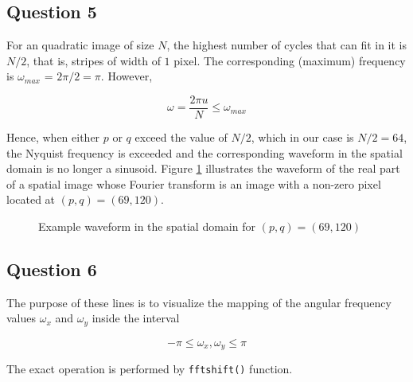 		
		
	\subsection{Question 5}
	
		For an quadratic image of size $N$, the highest number of cycles that can fit in it is $N/2$, that is, stripes of width of $1$ pixel.
		The corresponding (maximum) frequency is $\omega_{max}$ = $2\pi / 2 = \pi$. However, 
		
		\begin{equation}
		\omega = \frac{2\pi u}{N} \leq \omega_{max}	
		\end{equation}				
				
		Hence, when either $p$ or $q$ exceed the value of $N/2$, which in our case is $N/2 = 64$, the Nyquist frequency is exceeded
		and the corresponding waveform in the spatial domain is no longer a sinusoid. Figure \ref{fig:q5} illustrates the waveform of the
		real part of a spatial image whose Fourier transform is an image with a non-zero pixel located at $(p,q)=(69,120)$.
		
		\begin{figure}[H]
			\centering
			\scalebox{.4}{}
			\caption{Example waveform in the spatial domain for $(p,q)=(69,120)$}
			\label{fig:q5}
	  	\end{figure}
	  	
	
	\subsection{Question 6}
	
		The purpose of these lines is to visualize the mapping of the angular frequency values $\omega_x$ and $\omega_y$ inside the interval
	
		\begin{equation}
			-\pi \leq \omega_x, \omega_y \leq \pi
		\end{equation}
		
		The exact operation is performed by \texttt{fftshift()} function.